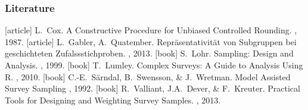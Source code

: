 \documentclass[10pt]{beamer}\usepackage[]{graphicx}\usepackage[]{color}
\newcommand{\eqname}[1]{\tag*{#1}} %
\newcommand{\E}[1]{\text{E}\left(#1\right)}
\newcommand{\V}[1]{\text{V}\left(#1\right)}
\begin{document}
% 


\begin{frame}[allowframebreaks]\frametitle{Literature}    
  \begin{thebibliography}{10}    
  [article]
    L.~Cox.
    \newblock  A Constructive Procedure for Unbiased Controlled Rounding.
    , 1987.
  [article]
    L.~Gabler, A.~Quatember.
    \newblock  Repr\"{a}sentativit\"{a}t von Subgruppen bei geschichteten Zufalssstichproben.
    , 2013.
  [book]
    S.~Lohr.
    \newblock  Sampling: Design and Analysis.
    , 1999.
  [book]
    T.~Lumley.
    \newblock Complex Surveys: A Guide to Analysis Using R.
    , 2010.
  [book]
    C.-E.~S\"{a}rndal, B.~Swensson, \& J.~Wretman.
    \newblock Model Assisted Survey Sampling
    , 1992.
  [book]
   R.~Valliant, J.A.~Dever, \& F.~Kreuter.
  \newblock  Practical Tools for Designing and Weighting Survey Samples.
    , 2013.
  \end{thebibliography}
\end{frame} 
\end{document}
